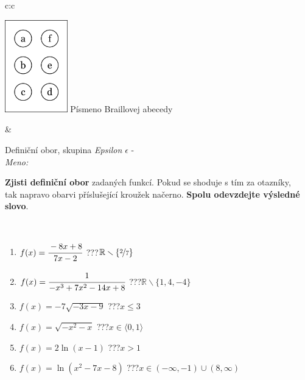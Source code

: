 \documentclass[10pt]{report}
\begin{document}
\begin{tabular}{c:c}
\begin{minipage}[c][104.5mm][t]{0.5\linewidth}
\begin{center}
\begin{minipage}{0.20\linewidth}
\begin{center}
\includegraphics[height=40mm]{../images/braille.png}
{\small Písmeno Braillovej abecedy}
\end{center}
\end{minipage}
\end{center}
\end{minipage}
&
\begin{minipage}[c][104.5mm][t]{0.5\linewidth}
\begin{center}
\vspace{7mm}
{\huge Definiční obor, skupina \textit{Epsilon $\epsilon$} -}\\[5mm]
\textit{Meno:}\phantom{xxxxxxxxxxxxxxxxxxxxxxxxxxxxxxxxxxxxxxxxxxxxxxxxxxxxxxxxxxxxxxxxx}\\[5mm]
\begin{minipage}{0.95\linewidth}
\textbf{Zjisti definiční obor} zadaných funkcí. Pokud se shoduje s tím za otazníky,\\tak napravo obarvi příslušející kroužek načerno. \textbf{Spolu odevzdejte výsledné slovo}.
\end{minipage}
\\[1mm]
\begin{minipage}{0.79\linewidth}
\begin{center}
\begin{varwidth}{\linewidth}
\begin{enumerate}
\normalsizerrr
\item $f(x)=\cfrac{-8x+8}{7x-2}$\quad \dotfill\; ???\;\dotfill \quad $\mathbb{R}\smallsetminus\{\nicefrac{2}{7}\}$
\item $f(x)=\cfrac{1}{-x^3+7x^2-14x+8}$\quad \dotfill\; ???\;\dotfill \quad $\mathbb{R}\smallsetminus\{1,4,-4\}$
\item $f(x)=-7\sqrt{-3x-9}$\quad \dotfill\; ???\;\dotfill \quad $x\leq3$
\item $f(x)=\sqrt{-x^2-x}$\quad \dotfill\; ???\;\dotfill \quad $x\in\langle0 , 1\rangle$
\item $f(x)=2\ln{(x-1)}$\quad \dotfill\; ???\;\dotfill \quad $x>1$
\item $f(x)=\ln{(x^2-7x-8)}$\quad \dotfill\; ???\;\dotfill \quad $x\in(-\infty , -1)\cup(8 , \infty)$

\end{enumerate}
\end{varwidth}
\end{center}
\end{minipage}
\end{center}
\end{minipage}
\end{tabular}
\end{document}
